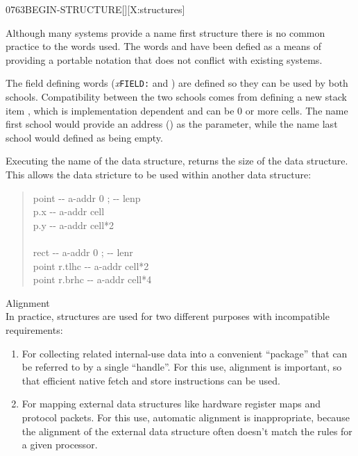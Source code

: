 \begin{worddef}{0763}{BEGIN-STRUCTURE}[][X:structures]
\begin{rationale}
		Although many systems provide a name first structure there
		is no common practice to the words used.  The words
		 and  have been
		defied as a means of providing a portable notation that does
		not conflict with existing systems.

		The field defining words (\emph{x}\texttt{FIELD:} and
		) are defined so they can be used by both
		schools.  Compatibility between the two schools comes from
		defining a new stack item , which is
		implementation dependent and can be 0 or more cells.
		The name first school would provide an address ()
		as the  parameter, while the name last
		school would defined  as being empty.

		Executing the name of the data structure, returns the size of
		the data structure.  This allows the data stricture to be used
		within another data structure:

		\begin{quote}\ttfamily
		 point \tab[-0.1]  -{}- a-addr 0 ; -{}- lenp \\
		\tab {} p.x		\tab[5.5]  -{}- a-addr cell \\
		\tab {} p.y      \tab[5.5]  -{}- a-addr cell*2 \\
		 \\

		 rect  \tab[1.3] -{}- a-addr 0 ; -{}- lenr \\
		\tab point  r.tlhc   \tab {} -{}- a-addr cell*2 \\
		\tab point  r.brhc   \tab {} -{}- a-addr cell*4 \\
		\end{quote}

	\item[Alignment] ~\\
		In practice, structures are used for two different purposes
		with incompatible requirements:
		\begin{enumerate}
		\item For collecting related internal-use data into a
			convenient ``package'' that can be referred to by a
			single ``handle''. For this use, alignment is important,
			so that efficient native fetch and store instructions
			can be used.

		\item For mapping external data structures like hardware
			register maps and protocol packets. For this use,
			automatic alignment is inappropriate, because the
			alignment of the external data structure often doesn't
			match the rules for a given processor.
		\end{enumerate}


\end{rationale}
\end{worddef}
